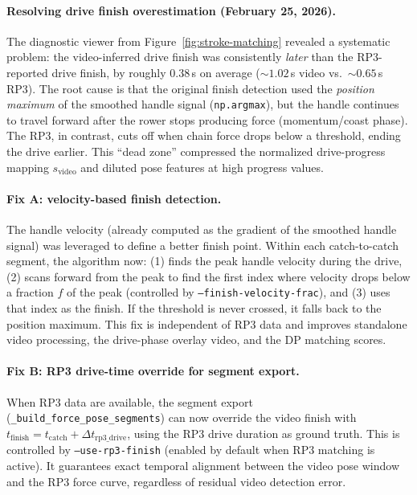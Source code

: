 \documentclass[11pt]{article}
\begin{document}
\paragraph{Resolving drive finish overestimation (February 25, 2026).}
The diagnostic viewer from Figure~\ref{fig:stroke-matching} revealed a systematic problem: the video-inferred drive finish was consistently \emph{later} than the RP3-reported drive finish, by roughly $0.38$\,s on average (${\sim}1.02$\,s video vs.\ ${\sim}0.65$\,s RP3). The root cause is that the original finish detection used the \emph{position maximum} of the smoothed handle signal (\texttt{np.argmax}), but the handle continues to travel forward after the rower stops producing force (momentum/coast phase). The RP3, in contrast, cuts off when chain force drops below a threshold, ending the drive earlier. This ``dead zone'' compressed the normalized drive-progress mapping $s_{\mathrm{video}}$ and diluted pose features at high progress values.

\paragraph{Fix A: velocity-based finish detection.}
The handle velocity (already computed as the gradient of the smoothed handle signal) was leveraged to define a better finish point. Within each catch-to-catch segment, the algorithm now: (1) finds the peak handle velocity during the drive, (2) scans forward from the peak to find the first index where velocity drops below a fraction $f$ of the peak (controlled by \texttt{--finish-velocity-frac}), and (3) uses that index as the finish. If the threshold is never crossed, it falls back to the position maximum. This fix is independent of RP3 data and improves standalone video processing, the drive-phase overlay video, and the DP matching scores.

\paragraph{Fix B: RP3 drive-time override for segment export.}
When RP3 data are available, the segment export (\texttt{\_build\_force\_pose\_segments}) can now override the video finish with $t_{\mathrm{finish}} = t_{\mathrm{catch}} + \Delta t_{\mathrm{rp3\_drive}}$, using the RP3 drive duration as ground truth. This is controlled by \texttt{--use-rp3-finish} (enabled by default when RP3 matching is active). It guarantees exact temporal alignment between the video pose window and the RP3 force curve, regardless of residual video detection error.
\end{document}
